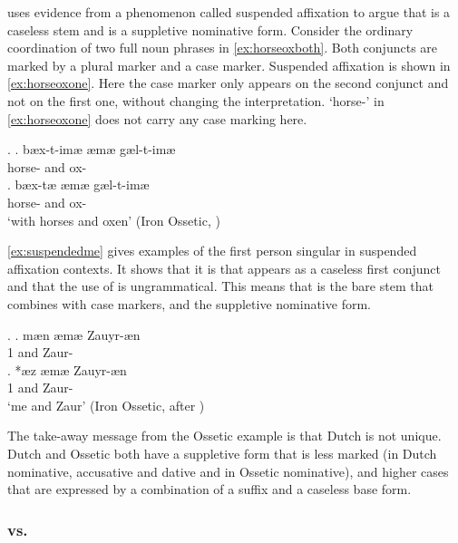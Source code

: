\documentclass[11pt,a4paper]{article}
\begin{document}
\citet{caha2019competition} uses evidence from a phenomenon called suspended affixation to argue that  is a caseless stem and  is a suppletive nominative form. Consider the ordinary coordination of two full noun phrases in \ref{ex:horseoxboth}. Both conjuncts are marked by a plural marker and a case marker. Suspended affixation is shown in \ref{ex:horseoxone}. Here the case marker only appears on the second conjunct and not on the first one, without changing the interpretation.
 `horse-' in \ref{ex:horseoxone} does not carry any case marking here.

\ex.
\ag. bæx-t-imæ æmæ gæl-t-imæ\\
horse- and ox-\\\label{ex:horseoxboth}
\bg. bæx-tæ æmæ gæl-t-imæ\\
horse- and ox-\\
`with horses and oxen' \hfill (Iron Ossetic, \citealt[165]{erschler2012})\label{ex:horseoxone}

\ref{ex:suspendedme} gives examples of the first person singular in suspended affixation contexts. It shows that it is  that appears as a caseless first conjunct and that the use of  is ungrammatical. This means that  is the bare stem that combines with case markers, and  the suppletive nominative form.

\ex.\label{ex:suspendedme}
\ag. mæn æmæ Zauyr-æn\\
 1 and Zaur-\\\label{ex:izaurboth}
\bg. *æz æmæ Zauyr-æn\\
 1 and Zaur-\\
 `me and Zaur' \hfill (Iron Ossetic, \citealt[39]{беляев2014} after \citealt{caha2019competition})\label{ex:izaurone}

The take-away message from the Ossetic example is that Dutch is not unique. Dutch and Ossetic both have a suppletive form that is less marked (in Dutch nominative, accusative and dative and in Ossetic nominative), and higher cases that are expressed by a combination of a suffix and a caseless base form.


\subsubsection{ vs. }
\end{document}
